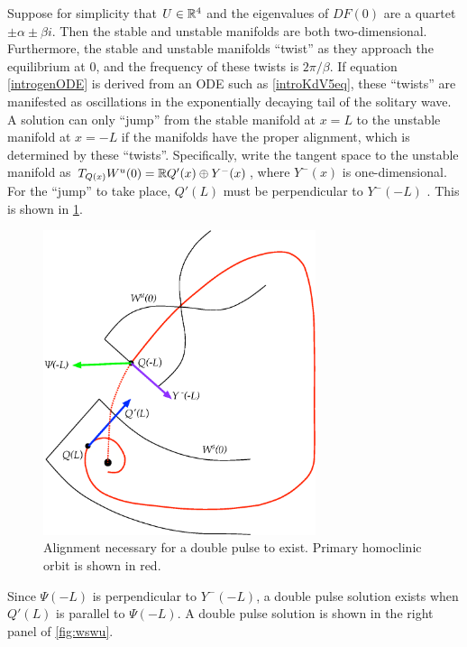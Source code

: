 \documentclass[thesis2.tex]{subfiles}
\begin{document}
Suppose for simplicity that $U \in \mathbb{R}^4$ and the eigenvalues of $DF(0)$ are a quartet $\pm \alpha \pm \beta i$. Then the stable and unstable manifolds are both two-dimensional. Furthermore, the stable and unstable manifolds ``twist'' as they approach the equilibrium at 0, and the frequency of these twists is $2 \pi / \beta$. If equation \cref{introgenODE} is derived from an ODE such as \cref{introKdV5eq}, these ``twists'' are manifested as oscillations in the exponentially decaying tail of the solitary wave. A solution can only ``jump'' from the stable manifold at $x = L$ to the unstable manifold at $x = -L$ if the manifolds have the proper alignment, which is determined by these ``twists''. Specifically, write the tangent space to the unstable manifold as $T_{Q(x)}W^u(0) = \mathbb{R} Q'(x) \oplus Y^-(x)$, where $Y^-(x)$ is one-dimensional. For the ``jump'' to take place, $Q'(L)$ must be perpendicular to $Y^-(-L)$ \cite{Sandstede1993,Sandstede2002}. This is shown in \cref{fig:manifoldslineup}.
\begin{figure}
\begin{center}
\includegraphics[width=8cm]{images/intro/manifoldslineup}
\caption[Alignment of manifolds necessary for a double pulse]{Alignment necessary for a double pulse to exist. Primary homoclinic orbit is shown in red.}
\label{fig:manifoldslineup}
\end{center}
\end{figure}
Since $\Psi(-L)$ is perpendicular to $Y^-(-L)$, a double pulse solution exists when $Q'(L)$ is parallel to $\Psi(-L)$. A double pulse solution is shown in the right panel of \cref{fig:wswu}. 
\end{document}
